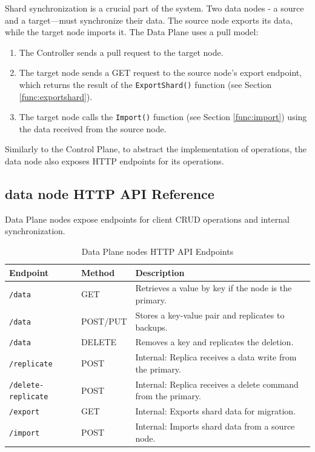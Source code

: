 \documentclass[shortabstract]{iithesis}
\begin{document}
Shard synchronization is a crucial part of the system. Two data nodes - a source and a target—must synchronize their data. The source node exports its data, while the target node imports it. The Data Plane uses a pull model:
\begin{enumerate}
    \item The Controller sends a pull request to the target node.
    \item The target node sends a GET request to the source node's export endpoint, which returns the result of the \texttt{ExportShard()} function (see Section \ref{func:exportshard}).
    \item The target node calls the \texttt{Import()} function (see Section \ref{func:import}) using the data received from the source node.
\end{enumerate}

Similarly to the Control Plane, to abstract the implementation of operations, the data node also exposes HTTP endpoints for its operations.

\subsection{data node HTTP API Reference}
Data Plane nodes expose endpoints for client CRUD operations and internal synchronization.

\begin{table}[h!]
\centering
\caption{Data Plane nodes HTTP API Endpoints}
\label{tab:datanode_endpoints}
\begin{tabularx}{\textwidth}{|l|l|X|}
\hline
\textbf{Endpoint} & \textbf{Method} & \textbf{Description} \\ \hline
\texttt{/data} & GET & Retrieves a value by key if the node is the primary. \\ \hline
\texttt{/data} & POST/PUT & Stores a key-value pair and replicates to backups. \\ \hline
\texttt{/data} & DELETE & Removes a key and replicates the deletion. \\ \hline
\texttt{/replicate} & POST & Internal: Replica receives a data write from the primary. \\ \hline
\texttt{/delete-replicate} & POST & Internal: Replica receives a delete command from the primary. \\ \hline
\texttt{/export} & GET & Internal: Exports shard data for migration. \\ \hline
\texttt{/import} & POST & Internal: Imports shard data from a source node. \\ \hline
\end{tabularx}
\end{table}
\end{document}
